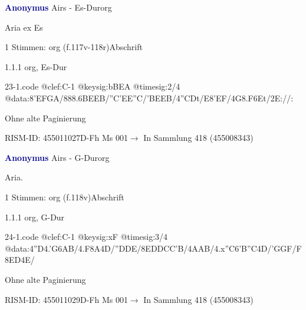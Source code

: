 \documentclass[twocolumn]{book}
\begin{document}
\par \vspace{7pt} \textcolor{darkblue}{\textbf{Anonymus  }}\hfillplus{\textbf{[23]}}\newline Airs - Es-Dur\newline org
\par \begin{itshape}[f.117v, heading:] Aria ex Es\end{itshape} 
\par \textcolor{darkblue}{}  1 Stimmen: org  (f.117v-118r)\newline Abschrift
\par 1.1.1  org, Es-Dur  
\begin{filecontents*}{23-1.code}
@clef:C-1
@keysig:bBEA
@timesig:2/4
@data:{8'EF}{GA}/888.6{BE}{EB}/{''C'E}{E''C}/{'BE}{EB}/4''CDt/E{8'EF}/4G{8.F6Et}/2E://:
\end{filecontents*}
\newline
%
\par Ohne alte Paginierung
\par RISM-ID: 455011027\newline D-Fh  Ms 001\newline $\rightarrow$ In Sammlung 418 (455008343)
      
\par \vspace{7pt} \textcolor{darkblue}{\textbf{Anonymus  }}\hfillplus{\textbf{[24]}}\newline Airs - G-Dur\newline org
\par \begin{itshape}[f.118v, heading:] Aria.\end{itshape} 
\par \textcolor{darkblue}{}  1 Stimmen: org  (f.118v)\newline Abschrift
\par 1.1.1  org, G-Dur  
\begin{filecontents*}{24-1.code}
@clef:C-1
@keysig:xF
@timesig:3/4
@data:4''D4.'G{6AB}/4.F8A4D/''DDE/{8EDDCC'B}/4AAB/4.x''C{6'B''C}4D/'GGF/F{8ED}4E/
\end{filecontents*}
\newline
%
\par Ohne alte Paginierung
\par RISM-ID: 455011029\newline D-Fh  Ms 001\newline $\rightarrow$ In Sammlung 418 (455008343)
      
\end{document}
